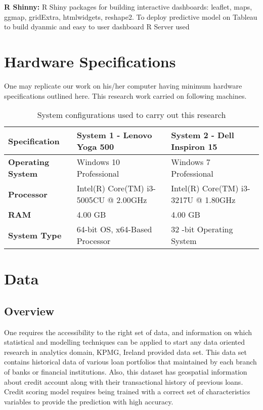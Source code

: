 \textbf{R Shinny:} R Shiny packages for building interactive dashboards: leaflet, maps, ggmap, gridExtra, htmlwidgets, reshape2. To deploy predictive model on Tableau to build dyanmic and easy to user dashboard R Server used

\section{Hardware Specifications}

One may replicate our work on his/her computer having minimum hardware specifications outlined here. This research work carried on following machines. 
\begin{table}[!htb]
\centering
\caption{System configurations used to carry out this research}
\label{osc4}
\begin{tabular}{|p{3cm}|p{5cm}|p{5cm}|}
\toprule
\textbf{Specification}    & \textbf{System 1 - Lenovo Yoga 500}   & \textbf{System 2 - Dell Inspiron 15} \\ \midrule
\textbf{Operating System} & Windows 10 Professional               & Windows 7 Professional               \\
\textbf{Processor}        & Intel(R) Core(TM) i3-5005CU @ 2.00GHz & Intel(R) Core(TM) i3-3217U @ 1.80GHz \\
\textbf{RAM}              & 4.00 GB                               & 4.00 GB                              \\
\textbf{System Type}      & 64-bit OS, x64-Based Processor        & 32 -bit Operating System             \\ \bottomrule
\end{tabular}
\end{table}


\section{Data}\label{ch4.3}

\subsection{Overview}
One requires the accessibility to the right set of data, and information on which statistical and modelling techniques can be applied to start any data oriented research in analytics domain, KPMG, Ireland provided data set. This data set contains historical data of various loan portfolios that maintained by each branch of banks or financial institutions. Also, this dataset has geospatial information about credit account along with their transactional history of previous loans. Credit scoring model requires being trained with a correct set of characteristics variables to provide the prediction with high accuracy.

